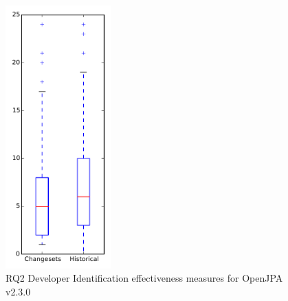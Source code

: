 
\begin{figure}[t]
\centering
\includegraphics[width=0.36\textwidth]{figures/dit/rq2_openjpa}
\caption{RQ2 Developer Identification effectiveness measures for OpenJPA v2.3.0}
\label{fig:dit:rq2:openjpa}
\end{figure}
